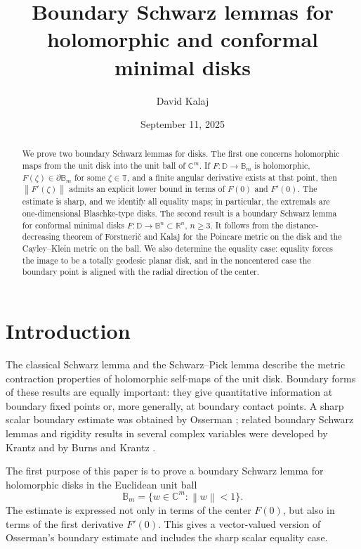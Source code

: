 \documentclass[11pt]{amsart}
\title[Boundary Schwarz lemmas for holomorphic and minimal disks]
{Boundary Schwarz lemmas for holomorphic and conformal minimal disks}
\author{David Kalaj}
\date{September 11, 2025}
\theoremstyle{definition}
\theoremstyle{remark}
\newcommand{\C}{\mathbb C}
\newcommand{\R}{\mathbb R}
\newcommand{\D}{\mathbb D}
\newcommand{\T}{\mathbb T}
\newcommand{\B}{\mathbb B}
\newcommand{\norm}[1]{\left\|#1\right\|}
\begin{document}
\begin{abstract}
We prove two boundary Schwarz lemmas for disks. The first one concerns holomorphic maps from the unit disk into the unit ball of \(\C^m\). If \(F:\D\to\B_m\) is holomorphic, \(F(\zeta)\in\partial\B_m\) for some \(\zeta\in\T\), and a finite angular derivative exists at that point, then \(\norm{F'(\zeta)}\) admits an explicit lower bound in terms of \(F(0)\) and \(F'(0)\). The estimate is sharp, and we identify all equality maps; in particular, the extremals are one-dimensional Blaschke-type disks. The second result is a boundary Schwarz lemma for conformal minimal disks \(F:\D\to\B^n\subset\R^n\), \(n\ge3\). It follows from the distance-decreasing theorem of Forstneri\v c and Kalaj for the Poincare metric on the disk and the Cayley--Klein metric on the ball. We also determine the equality case: equality forces the image to be a totally geodesic planar disk, and in the noncentered case the boundary point is aligned with the radial direction of the center.
\end{abstract}

\maketitle

\section{Introduction}

The classical Schwarz lemma and the Schwarz--Pick lemma describe the metric contraction properties of holomorphic self-maps of the unit disk. Boundary forms of these results are equally important: they give quantitative information at boundary fixed points or, more generally, at boundary contact points. A sharp scalar boundary estimate was obtained by Osserman \cite{osserman2000}; related boundary Schwarz lemmas and rigidity results in several complex variables were developed by Krantz \cite{Stefan2011} and by Burns and Krantz \cite{bk1994}.

The first purpose of this paper is to prove a boundary Schwarz lemma for holomorphic disks in the Euclidean unit ball
\[
        \B_m=\{w\in\C^m:\norm{w}<1\}.
\]
The estimate is expressed not only in terms of the center \(F(0)\), but also in terms of the first derivative \(F'(0)\). This gives a vector-valued version of Osserman's boundary estimate and includes the sharp scalar equality case.
\end{document}
